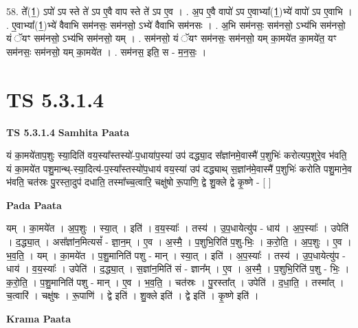 \documentclass[17pt]{extarticle}
\begin{document}
58. ते᳚(1॒) ऽपो॑ ऽप स्ते ते॑ ऽप ए॒वै वाप स्ते ते॑ ऽप ए॒व । . अ॒प ए॒वै वापो॑ ऽप ए॒वाभ्या᳚(1॒)भ्ये॑ वापो॑ ऽप ए॒वाभि । . ए॒वाभ्या᳚(1॒)भ्ये॑ वैवाभि सम॑नसः॒ सम॑नसो॒ ऽभ्ये॑ वैवाभि सम॑नसः । . अ॒भि सम॑नसः॒ सम॑नसो॒ ऽभ्य॑भि सम॑नसो॒ यं ॅयꣳ सम॑नसो॒ ऽभ्य॑भि सम॑नसो॒ यम् । . सम॑नसो॒ यं ॅयꣳ सम॑नसः॒ सम॑नसो॒ यम् का॒मये॑त का॒मये॑त॒ यꣳ सम॑नसः॒ सम॑नसो॒ यम् का॒मये॑त । . सम॑नस॒ इति॒ स - म॒न॒सः॒ । \newline
\pagebreak
{}

\section{ TS 5.3.1.4 }

\textbf{TS 5.3.1.4 } \newline
\textbf{Samhita Paata} \newline

यं का॒मये॑ताप॒शुः स्या॒दिति॑ वय॒स्या᳚स्तस्यो॑-प॒धाया॑प॒स्या॑ उप॑ दद्ध्या॒द स᳚ज्ञांनमे॒वास्मै॑ प॒शुभिः॑ करोत्यप॒शुरे॒व भ॑वति॒ यं का॒मये॑त पशु॒मान्थ्-स्या॒दित्य॑-प॒स्या᳚स्तस्यो॑प॒धाय॑ वय॒स्या॑ उप॑ दद्ध्याथ् स॒ज्ञांन॑मे॒वास्मै॑ प॒शुभिः॑ करोति पशु॒माने॒व भ॑वति॒ चत॑स्रः पु॒रस्ता॒दुप॑ दधाति॒ तस्मा᳚च्च॒त्वारि॒ चक्षु॑षो रू॒पाणि॒ द्वे शु॒क्ले द्वे कृ॒ष्णे - [  ] \newline

\textbf{Pada Paata} \newline

यम् । का॒मये॑त । अ॒प॒शुः । स्या॒त् । इति॑ । व॒य॒स्याः᳚ । तस्य॑ । उ॒प॒धायेत्यु॑प - धाय॑ । अ॒प॒स्याः᳚ । उपेति॑ । द॒द्ध्या॒त् । अस᳚ज्ञांन॒मित्यसं᳚ - ज्ञा॒न॒म् । ए॒व । अ॒स्मै॒ । प॒शुभि॒रिति॑ प॒शु-भिः॒ । क॒रो॒ति॒ । अ॒प॒शुः । ए॒व । भ॒व॒ति॒ । यम् । का॒मये॑त । प॒शु॒मानिति॑ पशु - मान् । स्या॒त् । इति॑ । अ॒प॒स्याः᳚ । तस्य॑ । उ॒प॒धायेत्यु॑प - धाय॑ । व॒य॒स्याः᳚ । उपेति॑ । द॒द्ध्या॒त् । स॒ज्ञांन॒मिति॑ सं - ज्ञान᳚म् । ए॒व । अ॒स्मै॒ । प॒शुभि॒रिति॑ प॒शु - भिः॒ । क॒रो॒ति॒ । प॒शु॒मानिति॑ पशु - मान् । ए॒व । भ॒व॒ति॒ । चत॑स्रः । पु॒रस्ता᳚त् । उपेति॑ । द॒धा॒ति॒ । तस्मा᳚त् । च॒त्वारि॑ । चक्षु॑षः । रू॒पाणि॑ । द्वे इति॑ । शु॒क्ले इति॑ । द्वे इति॑ । कृ॒ष्णे इति॑ ।  \newline


\textbf{Krama Paata} \newline
\end{document}
